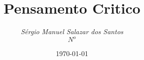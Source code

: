 \begin{titlepage}
\centering
\title{Pensamento Critico}
\author{\emph{S\'{e}rgio Manuel Salazar dos Santos}\\ \;$N^o$}
\date{\today}
\maketitle
\end{titlepage}